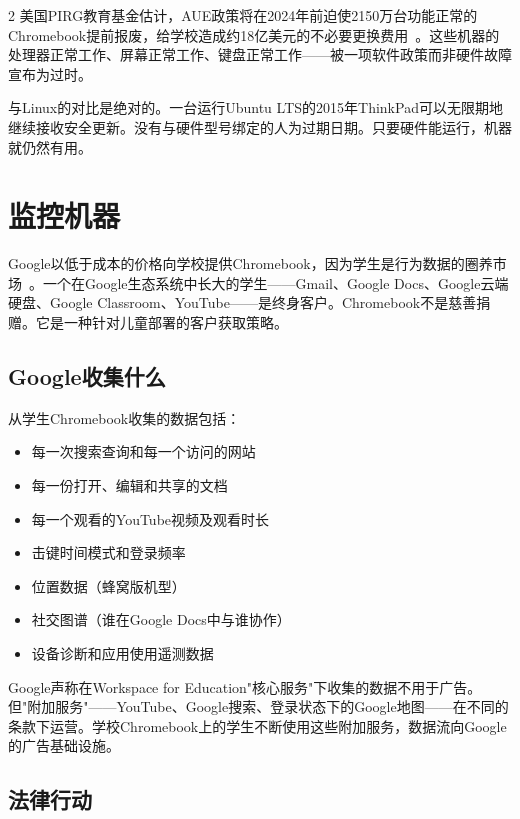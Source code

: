 \documentclass[11pt, a4paper]{article}
\begin{document}
\begin{multicols}{2}
美国PIRG教育基金估计，AUE政策将在2024年前迫使2150万台功能正常的Chromebook提前报废，给学校造成约18亿美元的不必要更换费用~\citep{pirg2023chromebook}。这些机器的处理器正常工作、屏幕正常工作、键盘正常工作——被一项软件政策而非硬件故障宣布为过时。

与Linux的对比是绝对的。一台运行Ubuntu LTS的2015年ThinkPad可以无限期地继续接收安全更新。没有与硬件型号绑定的人为过期日期。只要硬件能运行，机器就仍然有用。


\section{监控机器}
\label{sec:surveillance}

Google以低于成本的价格向学校提供Chromebook，因为学生是行为数据的圈养市场~\citep{zuboff2019surveillance, doctorow2020attack}。一个在Google生态系统中长大的学生——Gmail、Google Docs、Google云端硬盘、Google Classroom、YouTube——是终身客户。Chromebook不是慈善捐赠。它是一种针对儿童部署的客户获取策略。

\subsection{Google收集什么}

从学生Chromebook收集的数据包括：

\begin{itemize}
  \item 每一次搜索查询和每一个访问的网站
  \item 每一份打开、编辑和共享的文档
  \item 每一个观看的YouTube视频及观看时长
  \item 击键时间模式和登录频率
  \item 位置数据（蜂窝版机型）
  \item 社交图谱（谁在Google Docs中与谁协作）
  \item 设备诊断和应用使用遥测数据
\end{itemize}

Google声称在Workspace for Education"核心服务"下收集的数据不用于广告。但"附加服务"——YouTube、Google搜索、登录状态下的Google地图——在不同的条款下运营。学校Chromebook上的学生不断使用这些附加服务，数据流向Google的广告基础设施。

\subsection{法律行动}


\end{multicols}
\end{document}
